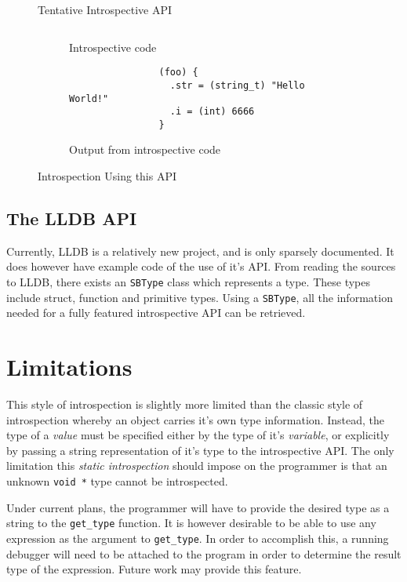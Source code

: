 \documentclass[twocolumn,draft]{article}
\begin{document}
\begin{figure}
	{
		\footnotesize
		\inputminted[tabsize=2]{c}{introspection.h}
	}
	\caption{Tentative Introspective API}
	\label{fig:introspective_api}
\end{figure}

\begin{figure}
	\begin{subfigure}{\linewidth}
		{
			\footnotesize
			\inputminted[tabsize=2]{c}{struct_introspect.c}
		}
		\caption{Introspective code}
		\label{fig:struct_introspect:code}
	\end{subfigure}
	\begin{subfigure}{\linewidth}
		{
			\footnotesize
			\begin{verbatim}
				(foo) {
				  .str = (string_t) "Hello World!"
				  .i = (int) 6666
				}
			\end{verbatim}
		}
		\caption{Output from introspective code}
		\label{fig:struct_introspect:output}
	\end{subfigure}
	\caption{Introspection Using this API}
	\label{fig:struct_introspect}
\end{figure}

\subsection{The LLDB API}
Currently, LLDB is a relatively new project, and is only sparsely documented. It
does however have example code of the use of it's API. From reading the sources
to LLDB, there exists an \texttt{SBType} class which represents a type. These
types include struct, function and primitive types. Using a \texttt{SBType}, all
the information needed for a fully featured introspective API can be retrieved.

\section{Limitations}
This style of introspection is slightly more limited than the classic style of
introspection whereby an object carries it's own type information. Instead, the
type of a \emph{value} must be specified either by the type of it's
\emph{variable}, or explicitly by passing a string representation of it's type
to the introspective API. The only limitation this \emph{static introspection}
should impose on the programmer is that an unknown \lstinline|void *| type
cannot be introspected.

Under current plans, the programmer will have to provide the desired type as a
string to the \texttt{get\_type} function. It is however desirable to be able to
use any expression as the argument to \texttt{get\_type}. In order to accomplish
this, a running debugger will need to be attached to the program in
order to determine the result type of the expression. Future work may provide
this feature.
\end{document}
